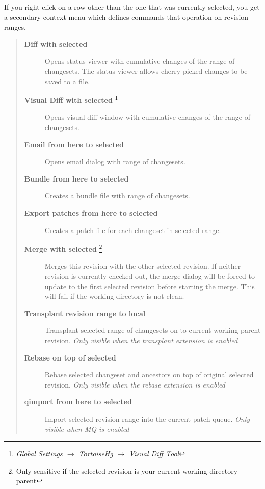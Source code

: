 \documentclass[letterpaper,10pt,english]{manual}
\begin{document}
If you right-click on a row other than the one that was currently
selected, you get a secondary context menu which defines commands that
operation on revision ranges.
\begin{quote}
\begin{description}
\item[\textbf{Diff with selected}]
Opens status viewer with cumulative changes of the range of
changesets.  The status viewer allows cherry picked changes to
be saved to a file.

\item[\textbf{Visual Diff with selected} \footnote{
\emph{Global Settings \(\rightarrow\) TortoiseHg \(\rightarrow\) Visual Diff Tool}
}]
Opens visual diff window with cumulative changes of the range
of changesets.

\item[\textbf{Email from here to selected}]
Opens email dialog with range of changesets.

\item[\textbf{Bundle from here to selected}]
Creates a bundle file with range of changesets.

\item[\textbf{Export patches from here to selected}]
Creates a patch file for each changeset in selected range.

\item[\textbf{Merge with selected} \footnote{
Only sensitive if the selected revision is your current working
directory parent
}]
Merges this revision with the other selected revision.  If
neither revision is currently checked out, the merge dialog will
be forced to update to the first selected revision before
starting the merge.  This will fail if the working directory is
not clean.

\item[\textbf{Transplant revision range to local}]
Transplant selected range of changesets on to current working
parent revision. \emph{Only visible when the transplant extension is
enabled}

\item[\textbf{Rebase on top of selected}]
Rebase selected changeset and ancestors on top of original
selected revision.  \emph{Only visible when the rebase extension is
enabled}

\item[\textbf{qimport from here to selected}]
Import selected revision range into the current patch queue.
\emph{Only visible when MQ is enabled}

\end{description}
\end{quote}
\end{document}

